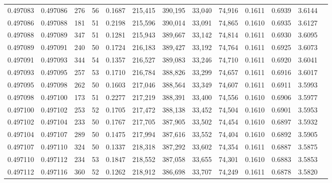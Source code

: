 \begin{tabular}{rrrrrrrrrrrrr}
0.497083 & 0.497086 & 276 &  56 &                                     0.1687 & 215,415 & 390,195 &  33,040 &  74,916 & 0.1611 & 0.6939 & 3.6144 \\
0.497086 & 0.497088 & 181 &  51 &                                     0.2198 & 215,596 & 390,014 &  33,091 &  74,865 & 0.1610 & 0.6935 & 3.6127 \\
0.497088 & 0.497089 & 347 &  51 &                                     0.1281 & 215,943 & 389,667 &  33,142 &  74,814 & 0.1611 & 0.6930 & 3.6095 \\
0.497089 & 0.497091 & 240 &  50 &                                     0.1724 & 216,183 & 389,427 &  33,192 &  74,764 & 0.1611 & 0.6925 & 3.6073 \\
0.497091 & 0.497093 & 344 &  54 &                                     0.1357 & 216,527 & 389,083 &  33,246 &  74,710 & 0.1611 & 0.6920 & 3.6041 \\
0.497093 & 0.497095 & 257 &  53 &                                     0.1710 & 216,784 & 388,826 &  33,299 &  74,657 & 0.1611 & 0.6916 & 3.6017 \\
0.497095 & 0.497098 & 262 &  50 &                                     0.1603 & 217,046 & 388,564 &  33,349 &  74,607 & 0.1611 & 0.6911 & 3.5993 \\
0.497098 & 0.497100 & 173 &  51 &                                     0.2277 & 217,219 & 388,391 &  33,400 &  74,556 & 0.1610 & 0.6906 & 3.5977 \\
0.497100 & 0.497102 & 253 &  52 &                                     0.1705 & 217,472 & 388,138 &  33,452 &  74,504 & 0.1610 & 0.6901 & 3.5953 \\
0.497102 & 0.497104 & 233 &  50 &                                     0.1767 & 217,705 & 387,905 &  33,502 &  74,454 & 0.1610 & 0.6897 & 3.5932 \\
0.497104 & 0.497107 & 289 &  50 &                                     0.1475 & 217,994 & 387,616 &  33,552 &  74,404 & 0.1610 & 0.6892 & 3.5905 \\
0.497107 & 0.497110 & 324 &  50 &                                     0.1337 & 218,318 & 387,292 &  33,602 &  74,354 & 0.1611 & 0.6887 & 3.5875 \\
0.497110 & 0.497112 & 234 &  53 &                                     0.1847 & 218,552 & 387,058 &  33,655 &  74,301 & 0.1610 & 0.6883 & 3.5853 \\
0.497112 & 0.497116 & 360 &  52 &                                     0.1262 & 218,912 & 386,698 &  33,707 &  74,249 & 0.1611 & 0.6878 & 3.5820 \\

\end{tabular}
